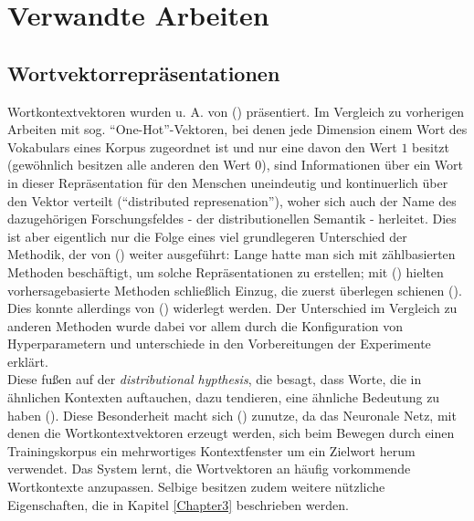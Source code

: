 
\chapter{Verwandte Arbeiten} %

\label{Chapter2} %


\section{Wortvektorrepräsentationen}\label{sec:represent}

Wortkontextvektoren wurden u. A. von (\cite{bengio2006neural}) präsentiert. Im Vergleich zu vorherigen Arbeiten mit sog. ``One-Hot''-Vektoren, bei denen
jede Dimension einem Wort des Vokabulars eines Korpus zugeordnet ist und nur eine davon den Wert $1$ besitzt (gewöhnlich
besitzen alle anderen den Wert $0$), sind Informationen über ein Wort in dieser Repräsentation für den Menschen uneindeutig
und kontinuerlich über den Vektor verteilt (``distributed represenation''), woher sich auch der Name des dazugehörigen
Forschungsfeldes - der distributionellen Semantik - herleitet. Dies ist aber eigentlich nur die Folge eines viel
grundlegeren Unterschied der Methodik, der von (\cite{baroni2014don}) weiter ausgeführt: Lange hatte man sich
mit zählbasierten Methoden beschäftigt, um solche Repräsentationen zu erstellen; mit (\cite{bengio2006neural}) hielten
vorhersagebasierte Methoden schließlich Einzug, die zuerst überlegen schienen (\cite{baroni2014don}). Dies konnte
allerdings von (\cite{levy2015improving}) widerlegt werden. Der Unterschied im Vergleich zu anderen Methoden
wurde dabei vor allem durch die Konfiguration von Hyperparametern und unterschiede in den Vorbereitungen der Experimente
erklärt. \\

Diese fußen auf der \emph{distributional hypthesis}, die besagt, dass Worte, die in ähnlichen Kontexten auftauchen, dazu
 tendieren, eine ähnliche Bedeutung zu haben (\cite{harris1954distributional}).
Diese Besonderheit macht sich (\cite{bengio2006neural}) zunutze, da das Neuronale Netz, mit denen die Wortkontextvektoren
erzeugt werden, sich beim Bewegen durch einen Trainingskorpus ein mehrwortiges Kontextfenster um ein Zielwort herum
verwendet. Das System lernt, die Wortvektoren an häufig vorkommende Wortkontexte anzupassen. Selbige besitzen zudem
weitere nützliche Eigenschaften, die in Kapitel \ref{Chapter3} beschrieben werden.\\


